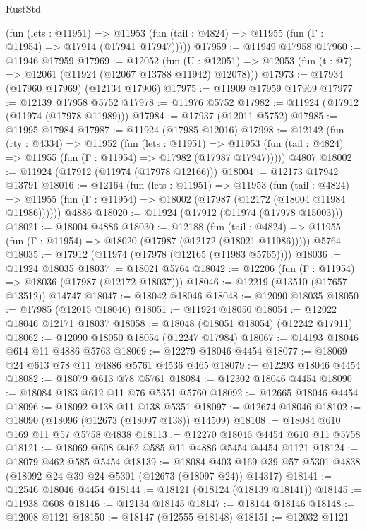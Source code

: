 \begin{lexlean}{RustStd}
\begin{coremodule}
      (fun (lets : @11951) =>
      @11953 (fun (tail : @4824) => @11955 (fun (Γ : @11954) => @17914 (@17941 @17947)))))
@17959 := @11949 @17958
@17960 := @11946 @17959
@17969 := @12052
    (fun (U : @12051) => @12053 (fun (t : @7) => @12061 (@11924 (@12067 @13788 @11942) @12078)))
@17973 := @17934 (@17960 @17969) (@12134 @17906)
@17975 := @11909 @17959 @17969
@17977 := @12139 @17958 @5752
@17978 := @11976 @5752
@17982 := @11924 (@17912 (@11974 (@17978 @11989)))
@17984 := @17937 (@12011 @5752)
@17985 := @11995 @17984
@17987 := @11924 (@17985 @12016)
@17998 := @12142
    (fun (rty : @4334) =>
    @11952
      (fun (lets : @11951) =>
      @11953 (fun (tail : @4824) => @11955 (fun (Γ : @11954) => @17982 (@17987 @17947)))))
    @4807
@18002 := @11924 (@17912 (@11974 (@17978 @12166)))
@18004 := @12173 @17942 @13791
@18016 := @12164
    (fun (lets : @11951) =>
    @11953
      (fun (tail : @4824) =>
      @11955 (fun (Γ : @11954) => @18002 (@17987 (@12172 (@18004 @11984 @11986))))))
    @4886
@18020 := @11924 (@17912 (@11974 (@17978 @15003)))
@18021 := @18004 @4886
@18030 := @12188
    (fun (tail : @4824) => @11955 (fun (Γ : @11954) => @18020 (@17987 (@12172 (@18021 @11986)))))
    @5764
@18035 := @17912 (@11974 (@17978 (@12165 (@11983 @5765))))
@18036 := @11924 @18035
@18037 := @18021 @5764
@18042 := @12206 (fun (Γ : @11954) => @18036 (@17987 (@12172 @18037)))
@18046 := @12219 (@13510 (@17657 @13512)) @14747
@18047 := @18042 @18046
@18048 := @12090 @18035
@18050 := @17985 (@12015 @18046)
@18051 := @11924 @18050
@18054 := @12022 @18046 @12171 @18037
@18058 := @18048 (@18051 @18054) (@12242 @17911)
@18062 := @12090 @18050 @18054 (@12247 @17984)
@18067 := @14193 @18046 @614 @11 @4886 @5763
@18069 := @12279 @18046 @4454
@18077 := @18069 @24 @613 @78 @11 @4886 @5761 @4536 @465
@18079 := @12293 @18046 @4454
@18082 := @18079 @613 @78 @5761
@18084 := @12302 @18046 @4454
@18090 := @18084 @183 @612 @11 @76 @5351 @5760
@18092 := @12665 @18046 @4454
@18096 := @18092 @138 @11 @138 @5351
@18097 := @12674 @18046
@18102 := @18090 (@18096 (@12673 (@18097 @138)) @14509)
@18108 := @18084 @610 @169 @11 @57 @5758 @4838
@18113 := @12270 @18046 @4454 @610 @11 @5758
@18121 := @18069 @608 @462 @585 @11 @4886 @5454 @4454 @1121
@18124 := @18079 @462 @585 @5454
@18139 := @18084
    @403
    @169
    @39
    @57
    @5301
    @4838
    (@18092 @24 @39 @24 @5301 (@12673 (@18097 @24)) @14317)
@18141 := @12546 @18046 @4454
@18144 := @18121 (@18124 (@18139 @18141))
@18145 := @11938 @608
@18146 := @12134 @18145
@18147 := @18144 @18146
@18148 := @12008 @1121
@18150 := @18147 (@12555 @18148)
@18151 := @12032 @1121

\end{coremodule}
\end{lexlean}

